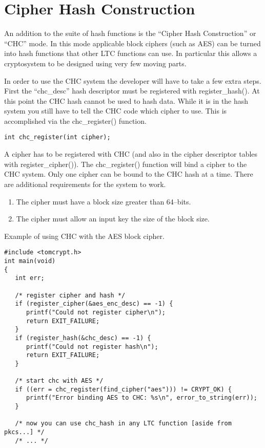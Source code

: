 \documentclass[a4paper]{book}
\begin{document}
\section{Cipher Hash Construction}
An addition to the suite of hash functions is the ``Cipher Hash Construction'' or ``CHC'' mode.  In this mode
applicable block ciphers (such as AES) can be turned into hash functions that other LTC functions can use.  In 
particular this allows a cryptosystem to be designed using very few moving parts.

In order to use the CHC system the developer will have to take a few extra steps.  First the ``chc\_desc'' hash
descriptor must be registered with register\_hash().  At this point the CHC hash cannot be used to hash
data.  While it is in the hash system you still have to tell the CHC code which cipher to use.  This is accomplished
via the chc\_register() function.

\begin{verbatim}
int chc_register(int cipher);
\end{verbatim}

A cipher has to be registered with CHC (and also in the cipher descriptor tables with 
register\_cipher()).  The chc\_register() function will bind a cipher to the CHC system.  Only one cipher can 
be bound to the CHC hash at a time.  There are additional requirements for the system to work.

\begin{enumerate}
   \item The cipher must have a block size greater than 64--bits.  
   \item The cipher must allow an input key the size of the block size.
\end{enumerate}

Example of using CHC with the AES block cipher.

\begin{verbatim}
#include <tomcrypt.h>
int main(void)
{
   int err; 

   /* register cipher and hash */
   if (register_cipher(&aes_enc_desc) == -1) {
      printf("Could not register cipher\n");
      return EXIT_FAILURE;
   }
   if (register_hash(&chc_desc) == -1) {
      printf("Could not register hash\n");
      return EXIT_FAILURE;
   }

   /* start chc with AES */
   if ((err = chc_register(find_cipher("aes"))) != CRYPT_OK) {
      printf("Error binding AES to CHC: %s\n", error_to_string(err));
   }

   /* now you can use chc_hash in any LTC function [aside from pkcs...] */
   /* ... */
\end{verbatim}
\end{document}
